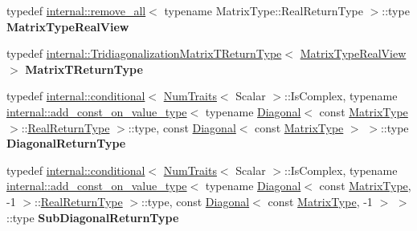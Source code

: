 \begin{DoxyCompactItemize}
\item 
\mbox{\label{group___eigenvalues___module_a28b71fa9329f5881fa2fc6732941c2b3}} 
typedef \hyperlink{struct_eigen_1_1internal_1_1remove__all}{internal\+::remove\+\_\+all}$<$ typename Matrix\+Type\+::\+Real\+Return\+Type $>$\+::type {\bfseries Matrix\+Type\+Real\+View}
\item 
\mbox{\label{group___eigenvalues___module_af7d2f1a605207a321f494d9ee216f8f5}} 
typedef \hyperlink{struct_eigen_1_1internal_1_1_tridiagonalization_matrix_t_return_type}{internal\+::\+Tridiagonalization\+Matrix\+T\+Return\+Type}$<$ \hyperlink{group___sparse_core___module}{Matrix\+Type\+Real\+View} $>$ {\bfseries Matrix\+T\+Return\+Type}
\item 
\mbox{\label{group___eigenvalues___module_aa2b866d55c2210db98a7ab2ccf0d2254}} 
typedef \hyperlink{struct_eigen_1_1internal_1_1conditional}{internal\+::conditional}$<$ \hyperlink{group___core___module_struct_eigen_1_1_num_traits}{Num\+Traits}$<$ Scalar $>$\+::Is\+Complex, typename \hyperlink{struct_eigen_1_1internal_1_1add__const__on__value__type}{internal\+::add\+\_\+const\+\_\+on\+\_\+value\+\_\+type}$<$ typename \hyperlink{group___core___module_class_eigen_1_1_diagonal}{Diagonal}$<$ const \hyperlink{group___eigenvalues___module_add0f4b2216d0ea8ee0f7d8525deaf0a9}{Matrix\+Type} $>$\+::\hyperlink{class_eigen_1_1internal_1_1_tensor_lazy_evaluator_writable}{Real\+Return\+Type} $>$\+::type, const \hyperlink{group___core___module_class_eigen_1_1_diagonal}{Diagonal}$<$ const \hyperlink{group___eigenvalues___module_add0f4b2216d0ea8ee0f7d8525deaf0a9}{Matrix\+Type} $>$ $>$\+::type {\bfseries Diagonal\+Return\+Type}
\item 
\mbox{\label{group___eigenvalues___module_a596ee75896d4302b84b1467d5c74e871}} 
typedef \hyperlink{struct_eigen_1_1internal_1_1conditional}{internal\+::conditional}$<$ \hyperlink{group___core___module_struct_eigen_1_1_num_traits}{Num\+Traits}$<$ Scalar $>$\+::Is\+Complex, typename \hyperlink{struct_eigen_1_1internal_1_1add__const__on__value__type}{internal\+::add\+\_\+const\+\_\+on\+\_\+value\+\_\+type}$<$ typename \hyperlink{group___core___module_class_eigen_1_1_diagonal}{Diagonal}$<$ const \hyperlink{group___eigenvalues___module_add0f4b2216d0ea8ee0f7d8525deaf0a9}{Matrix\+Type}, -\/1 $>$\+::\hyperlink{class_eigen_1_1internal_1_1_tensor_lazy_evaluator_writable}{Real\+Return\+Type} $>$\+::type, const \hyperlink{group___core___module_class_eigen_1_1_diagonal}{Diagonal}$<$ const \hyperlink{group___eigenvalues___module_add0f4b2216d0ea8ee0f7d8525deaf0a9}{Matrix\+Type}, -\/1 $>$ $>$\+::type {\bfseries Sub\+Diagonal\+Return\+Type}

\end{DoxyCompactItemize}
